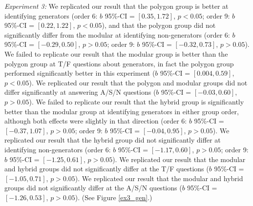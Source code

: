 \documentclass[man,mask,10pt]{apa6}
\begin{document}
\textit{Experiment 3:} We replicated our result that the polygon group is better at identifying generators (order 6: $b$ 95\%-CI = $[0.35,1.72]$, $p < 0.05$; order 9: $b$ 95\%-CI = $[0.22,1.22]$, $p < 0.05$), and that the polygon group did not significantly differ from the modular at identifying non-generators (order 6: $b$ 95\%-CI = $[-0.29,0.50]$, $p > 0.05$; order 9: $b$ 95\%-CI = $[-0.32,0.73]$, $p > 0.05$). We failed to replicate our result that the modular group is better than the polygon group at T/F questions about generators, in fact the polygon group performed significantly better in this experiment ($b$ 95\%-CI = $[0.004,0.59]$, $p < 0.05$). We replicated our result that the polygon and modular groups did not differ significantly at answering A/S/N questions ($b$ 95\%-CI = $[-0.03,0.60]$, $p > 0.05$). We failed to replicate our result that the hybrid group is significantly better than the modular group at identifying generators in either group order, although both effects were slightly in that direction (order 6: $b$ 95\%-CI = $[-0.37,1.07]$, $p > 0.05$; order 9: $b$ 95\%-CI = $[-0.04, 0.95]$, $p > 0.05$). We replicated our result that the hybrid group did not significantly differ at identifying non-generators (order 6: $b$ 95\%-CI = $[-1.17,0.60]$, $p > 0.05$; order 9: $b$ 95\%-CI = $[-1.25,0.61]$, $p > 0.05$). We replicated our result that the modular and hybrid groups did not significantly differ at the T/F questions ($b$ 95\%-CI = $[-1.05, 0.71]$, $p > 0.05$). We replicated our result that the modular and hybrid groups did not significantly differ at the A/S/N questions ($b$ 95\%-CI = $[-1.26,0.53]$, $p > 0.05$). (See Figure \ref{ex3_gen}.) \par
\end{document}
